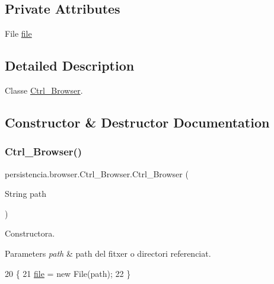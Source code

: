 \subsection*{Private Attributes}
\begin{DoxyCompactItemize}
\item 
File \hyperlink{classpersistencia_1_1browser_1_1Ctrl__Browser_a72c151aed575c0848f7dbb1609b373c8}{file}
\end{DoxyCompactItemize}


\subsection{Detailed Description}
Classe \hyperlink{classpersistencia_1_1browser_1_1Ctrl__Browser}{Ctrl\+\_\+\+Browser}. 

\subsection{Constructor \& Destructor Documentation}
\mbox{\label{classpersistencia_1_1browser_1_1Ctrl__Browser_a6cd8687a9748fc4c169d1d72be7081b1}} 
\subsubsection{\texorpdfstring{Ctrl\+\_\+\+Browser()}{Ctrl\_Browser()}}
{\footnotesize\ttfamily persistencia.\+browser.\+Ctrl\+\_\+\+Browser.\+Ctrl\+\_\+\+Browser (\begin{DoxyParamCaption}\item[{String}]{path }\end{DoxyParamCaption})\hspace{0.3cm}{\ttfamily [inline]}}



Constructora. 


\begin{DoxyParams}{Parameters}
{\em path} & path del fitxer o directori referenciat. \\
\hline
\end{DoxyParams}

\begin{DoxyCode}
20                                      \{
21         \hyperlink{classpersistencia_1_1browser_1_1Ctrl__Browser_a72c151aed575c0848f7dbb1609b373c8}{file} = \textcolor{keyword}{new} File(path);
22     \}
\end{DoxyCode}


